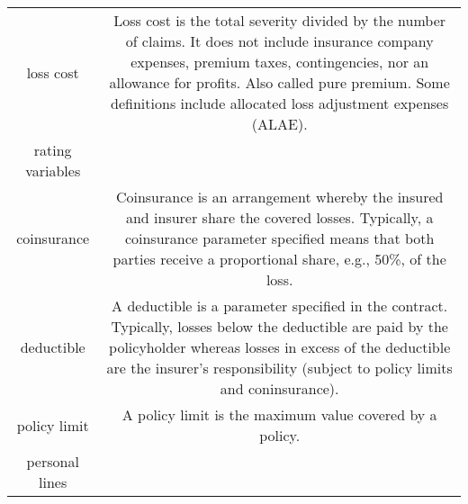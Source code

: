 \documentclass[]{book}
\theoremstyle{definition}
\theoremstyle{definition}
\theoremstyle{definition}
\theoremstyle{remark}
\begin{document}
\begin{longtable}[]{@{}cc@{}}
\begin{minipage}[t]{0.39\columnwidth}
loss cost\strut
\end{minipage} & \begin{minipage}[t]{0.42\columnwidth}\centering\strut
Loss cost is the total severity divided by the number of claims. It does
not include insurance company expenses, premium taxes, contingencies,
nor an allowance for profits. Also called pure premium. Some definitions
include allocated loss adjustment expenses (ALAE).\strut
\end{minipage}\tabularnewline
\begin{minipage}[t]{0.39\columnwidth}\centering\strut
rating variables\strut
\end{minipage} & \begin{minipage}[t]{0.42\columnwidth}\centering\strut
\strut
\end{minipage}\tabularnewline
\begin{minipage}[t]{0.39\columnwidth}\centering\strut
coinsurance\strut
\end{minipage} & \begin{minipage}[t]{0.42\columnwidth}\centering\strut
Coinsurance is an arrangement whereby the insured and insurer share the
covered losses. Typically, a coinsurance parameter specified means that
both parties receive a proportional share, e.g., 50\%, of the
loss.\strut
\end{minipage}\tabularnewline
\begin{minipage}[t]{0.39\columnwidth}\centering\strut
deductible\strut
\end{minipage} & \begin{minipage}[t]{0.42\columnwidth}\centering\strut
A deductible is a parameter specified in the contract. Typically, losses
below the deductible are paid by the policyholder whereas losses in
excess of the deductible are the insurer's responsibility (subject to
policy limits and coninsurance).\strut
\end{minipage}\tabularnewline
\begin{minipage}[t]{0.39\columnwidth}\centering\strut
policy limit\strut
\end{minipage} & \begin{minipage}[t]{0.42\columnwidth}\centering\strut
A policy limit is the maximum value covered by a policy.\strut
\end{minipage}\tabularnewline
\begin{minipage}[t]{0.39\columnwidth}\centering\strut
personal lines\strut
\end{minipage} & \begin{minipage}[t]{0.42\columnwidth}\centering\strut

\end{minipage}
\end{longtable}
\end{document}
